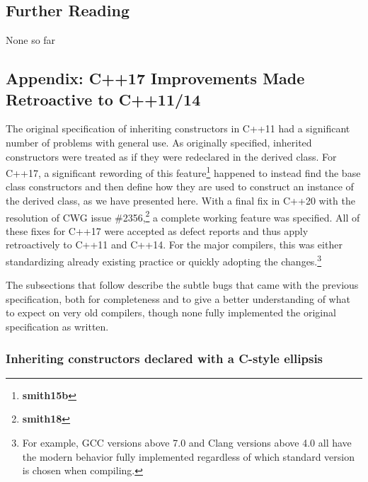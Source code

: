 \subsection[Further Reading]{Further Reading}\label{further-reading}

None so far

\subsection[Appendix: C++17 Improvements Made Retroactive to C++11/14]{Appendix: C++17 Improvements Made Retroactive to C++11/14}\label{appendix}\label{c++17-improvements-made-retroactive-to-c++11/14}

The original specification of inheriting constructors in C++11 had a
significant number of problems with general use. As originally specified,
inherited constructors were treated as if they were redeclared in
the derived class. For C++17, a significant rewording of this feature\footnote{\textbf{smith15b}}
happened to instead find the base class
constructors and then define how they are used to construct an instance
of the derived class, as we have presented here. With a final fix in
C++20 with the resolution of CWG issue \#2356,\footnote{\textbf{smith18}} a complete
working feature was specified. All of these fixes for C++17 were
accepted as defect reports and thus apply retroactively to C++11 and
C++14. For the major compilers, this was either standardizing already
existing practice or quickly adopting the changes.{\cprotect\footnote{For example, GCC versions above 7.0
and Clang versions above 4.0 all have the modern behavior
fully implemented regardless of which standard version is chosen when
  compiling.}}

The subsections that follow describe the subtle bugs that came with the previous
specification, both for completeness and to give a better
understanding of what to expect on very old compilers, though none fully
implemented the original specification as written.

\subsubsection[Inheriting constructors declared with a C-style ellipsis]{Inheriting constructors declared with a C-style ellipsis}

